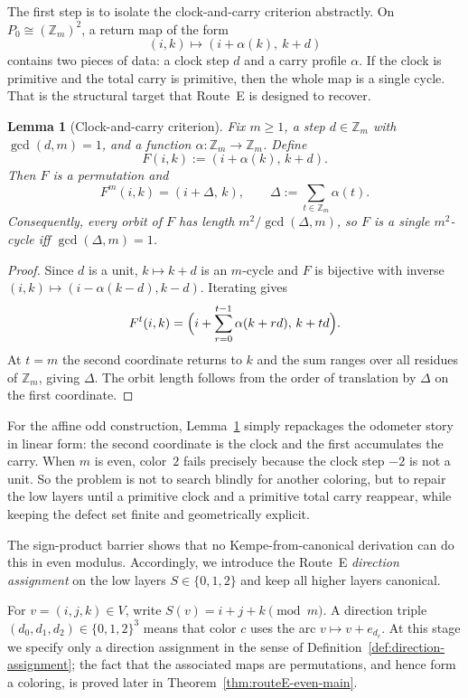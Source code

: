 \documentclass[11pt]{article}
\newtheorem{lemma}{Lemma}
\begin{document}
The first step is to isolate the clock-and-carry criterion abstractly.
On $P_0\cong (\mathbb Z_m)^2$, a return map of the form
\[
(i,k)\longmapsto (i+\alpha(k),\ k+d)
\]
contains two pieces of data: a clock step $d$ and a carry profile $\alpha$.
If the clock is primitive and the total carry is primitive, then the whole map is a single cycle.
That is the structural target that Route~E is designed to recover.

\begin{lemma}[Clock-and-carry criterion]\label{lem:skew-product}
Fix $m\ge 1$, a step $d\in \mathbb Z_m$ with $\gcd(d,m)=1$, and a function $\alpha:\mathbb Z_m\to\mathbb Z_m$.
Define
\[
F(i,k):=(i+\alpha(k),\,k+d).
\]
Then $F$ is a permutation and
\[
F^m(i,k)=(i+\Delta,\,k),\qquad \Delta:=\sum_{t\in\mathbb Z_m}\alpha(t).
\]
Consequently, every orbit of $F$ has length $m^2/\gcd(\Delta,m)$, so $F$ is a single $m^2$-cycle iff $\gcd(\Delta,m)=1$.
\end{lemma}

\begin{proof}
Since $d$ is a unit, $k\mapsto k+d$ is an $m$-cycle and $F$ is bijective with inverse $(i,k)\mapsto(i-\alpha(k-d),k-d)$.
Iterating gives
\[
F^t(i,k)=\Bigl(i+\sum_{r=0}^{t-1}\alpha(k+rd),\,k+td\Bigr).
\]
At $t=m$ the second coordinate returns to $k$ and the sum ranges over all residues of $\mathbb Z_m$, giving $\Delta$.
The orbit length follows from the order of translation by $\Delta$ on the first coordinate.
\end{proof}

For the affine odd construction, Lemma~\ref{lem:skew-product} simply repackages the odometer story in linear form: the second coordinate is the clock and the first accumulates the carry.
When $m$ is even, color~$2$ fails precisely because the clock step $-2$ is not a unit.
So the problem is not to search blindly for another coloring, but to repair the low layers until a primitive clock and a primitive total carry reappear, while keeping the defect set finite and geometrically explicit.

The sign-product barrier shows that no Kempe-from-canonical derivation can do this in even modulus.
Accordingly, we introduce the Route~E \emph{direction assignment} on the low layers $S\in\{0,1,2\}$ and keep all higher layers canonical.

For $v=(i,j,k)\in V$, write $S(v)=i+j+k\pmod m$.
A direction triple $(d_0,d_1,d_2)\in\{0,1,2\}^3$ means that color $c$ uses the arc $v\mapsto v+e_{d_c}$.
At this stage we specify only a direction assignment in the sense of Definition~\ref{def:direction-assignment}; the fact that the associated maps are permutations, and hence form a coloring, is proved later in Theorem~\ref{thm:routeE-even-main}.
\end{document}
